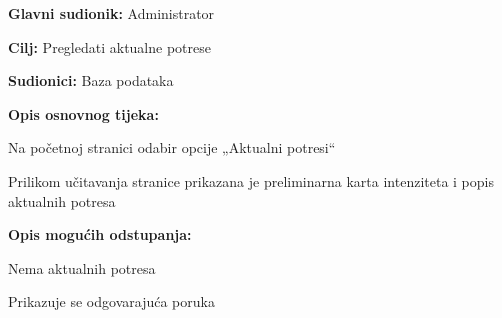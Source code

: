 					\noindent {}
					\begin{packed_item}
	
						\item \textbf{Glavni sudionik:} Administrator
						\item \textbf{Cilj:} Pregledati aktualne potrese
						\item \textbf{Sudionici:} Baza podataka

						\item \textbf{Opis osnovnog tijeka:}
						
						\item[] \begin{packed_enum}
							\item Na početnoj stranici odabir opcije „Aktualni potresi“
							\item Prilikom učitavanja stranice prikazana je preliminarna karta intenziteta i popis aktualnih potresa
						\end{packed_enum}
						
						\item  \textbf{Opis mogućih odstupanja:}
						
						\item[] \begin{packed_item}
	
							\item[2.a] Nema aktualnih potresa
							\item[] \begin{packed_enum}
								
								\item Prikazuje se odgovarajuća poruka
								
							\end{packed_enum}
							
						\end{packed_item}
						
					\end{packed_item}

